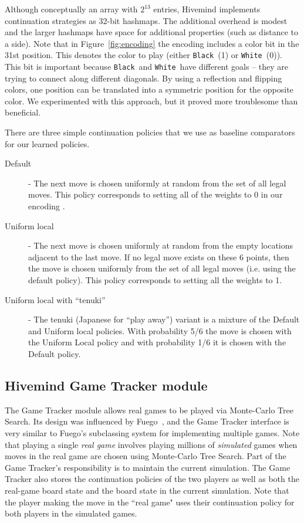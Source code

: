 \documentclass{acm_proc_article-sp}
\newcommand{\black}{\texttt{Black}}
\newcommand{\white}{\texttt{White}}
\begin{document}
Although conceptually an array with $2^{13}$ entries, Hivemind implements continuation strategies as
32-bit hashmaps.  
The additional overhead is modest and the larger hashmaps  have space for additional properties (such as distance to a side).
Note that in Figure~\ref{fig:encoding} the encoding includes a color bit in the 31st position. This denotes the color to play (either \black\ (1) or \white\ (0)). 
This bit is important because \black\ and \white\ have different goals -- they are trying to connect along different diagonals. 
By using a reflection and flipping colors, one position can be translated into a symmetric  position for the opposite color. 
We experimented with this approach, but it proved more troublesome than beneficial.

There are three simple continuation policies that we use as baseline comparators for our learned policies.

\begin{description}
	\item[Default] - The next move is chosen uniformly at random from the set of all legal moves.
	This policy corresponds to setting all of the weights to 0 in our encoding .
	\item[Uniform local] - The next move is chosen uniformly at random from the empty locations adjacent to the last move.
	If no legal move exists on these 6 points, then the move is chosen uniformly from the set of all legal moves 
	(i.e. using the default policy).  This policy corresponds to setting all the weights to 1.
	\item[Uniform local with ``tenuki''] - The tenuki (Japanese for  ``play away'') variant is a mixture of the Default and Uniform local policies.  
	With probability 5/6 the move is chosen with the Uniform Local policy and with probability 1/6 it is chosen with the Default policy. 
\end{description}


\subsection{Hivemind Game Tracker module}
\label{s:tracker}

The Game Tracker module allows real games to be played via Monte-Carlo Tree Search.
Its design was influenced by Fuego~\cite{Fuego},  and the Game Tracker interface is very similar to Fuego's subclassing system for implementing multiple games.
Note that playing a single \emph{real game} involves playing millions of  \emph{simulated} games when
moves in the real game are chosen using Monte-Carlo Tree Search.
Part of the Game Tracker's responsibility is to maintain the 
current simulation.
The Game Tracker also stores the continuation policies of the two players as well as both
the real-game board state and the board state in the current simulation.
Note that the player making the move in the ``real game" uses their continuation policy for both players in the simulated games.
\end{document}
